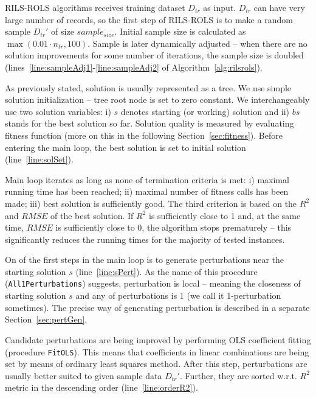 \documentclass[a4paper,12pt]{elsarticle}
\begin{document}
RILS-ROLS algorithms receives training dataset $D_{tr}$ as input. $D_{tr}$ can have very large number of records, so the first step of RILS-ROLS is to make a random sample $D_{tr}'$ of size $sample_{size}$. Initial sample size is calculated as $\max(0.01 \cdot n_{tr}, 100)$. Sample is later dynamically adjusted -- when there are no solution improvements for some number of iterations, the sample size is doubled (lines~\ref{line:sampleAdj1}-\ref{line:sampleAdj2} of Algorithm~\ref{alg:rilsrols}).


As previously stated, solution is usually represented as a tree. We use simple solution initialization -- tree root node is set to zero constant. We interchangeably use two solution variables: i) $s$ denotes starting (or working) solution and ii) $bs$ stands for the best solution so far. Solution quality is measured by evaluating fitness function (more on this in the following Section~\ref{sec:fitness}). Before entering the main loop, the best solution is set to initial solution (line~\ref{line:solSet}).


Main loop iterates as long as none of termination criteria is met: i) maximal running time has been reached; ii) maximal number of fitness calls has been made; iii) best solution is sufficiently good.
The third criterion is based on the $R^2$ and $RMSE$ of the best solution. If $R^2$ is sufficiently close to 1 and, at the same time, $RMSE$ is sufficiently close to 0, the algorithm stops prematurely -- this significantly reduces the running times for the majority of tested instances.  


On of the first steps in the main loop is to generate perturbations near the starting solution $s$ (line~\ref{line:sPert}). 
As the name of this procedure (\texttt{All1Perturbations}) suggests, perturbation is local -- meaning the closeness of starting solution $s$ and any of perturbations is 1 (we call it 1-perturbation sometimes). The precise way of generating perturbation is described in a separate Section~\ref{sec:pertGen}. 


Candidate perturbations are being improved by performing OLS coefficient fitting (procedure \texttt{FitOLS}). This means that coefficients in linear combinations are being set by means of ordinary least squares method.  
After this step, perturbations are usually better suited to given sample data $D_{tr}'$. 
Further, they are sorted w.r.t. $R^2$ metric in the descending order (line~\ref{line:orderR2}). 
\end{document}
